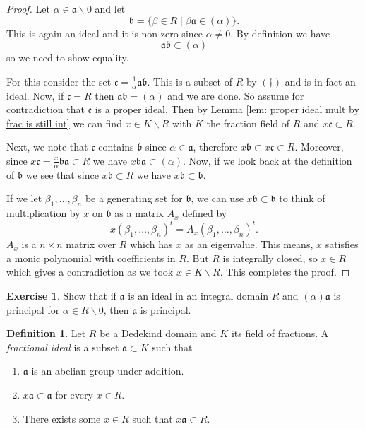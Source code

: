\documentclass[11pt,a4paper]{report}
\theoremstyle{plain}
\theoremstyle{definition}
\newtheorem{definition}[subsection]{Definition}
\theoremstyle{definition}
\newtheorem{question}[subsection]{Exercise}
\def\gothb{\mathfrak{b}}
\def\gothc{\mathfrak{c}}
\def \a{\alpha}
\def\gotha{\mathfrak{a}}
\begin{document}
	
	\begin{proof}
		Let $\a \in \gotha \backslash 0$ and let \[\gothb=\{\beta \in R \mid \beta \gotha \in (\a)\}.\] This is again an ideal and it is non-zero since $\a \neq 0$. By definition we have \begin{equation}
			\gotha \gothb \subset (\a) \tag{$\dagger$}\end{equation} so we need to show equality.
		
		For this consider the set $\gothc=\frac{1}{\a}\gotha \gothb$. This is a subset of $R$ by $(\dagger)$ and is in fact an ideal. Now, if $\gothc=R$ then $\gotha \gothb=(\a)$ and we are done. So assume for contradiction that $\gothc$ is a proper ideal. Then by Lemma \ref{lem: proper ideal mult by frac is still int} we can find $x \in K \backslash R$ with $K$ the fraction field of $R$ and $x \gothc \subset R$. 
		
		Next, we note that $\gothc$ contains $\gothb$ since $\a \in \gotha$, therefore $x \gothb \subset x \gothc \subset R$. Moreover, since $x\gothc=\frac{x}{\a}\gothb \gotha \subset R$ we have $x\gothb \gotha \subset (\a)$. Now, if we look back at the definition of $\gothb$ we see that since $x \gothb \subset R$ we have $x\gothb \subset \gothb$.
		
		If we let $\beta_1,\dots,\beta_n$ be a generating set for $\gothb$, we can use $x\gothb \subset \gothb$ to think of multiplication by $x$ on $\gothb$ as a matrix $A_x$ defined by \[x (\beta_1,\dots,\beta_n)^t=A_x (\beta_1,\dots,\beta_n)^t.\] $A_x$ is a $n \times n$ matrix over $R$ which has $x$ as an eigenvalue. This means, $x$ satisfies a monic polynomial with coefficients in $R$. But $R$ is integrally closed, so $x \in R$ which gives a contradiction as we took $x \in K\backslash R$. This completes the proof. 
	\end{proof}
	
	
	
	\begin{question}\label{ques: if prod is princ, you are princ}
		Show that if $\gotha$ is an ideal in an integral domain $R$ and $(\a)\gotha$ is principal for $\a \in R \backslash{0}$, then $\gotha$ is principal.
	\end{question}
	
	\begin{definition}
		Let $R$ be a Dedekind domain and $K$ its field of fractions. A \textit{fractional ideal} is a subset $\gotha \subset K$ such that 
		\begin{enumerate}
			\item $\gotha$ is an abelian group under addition.
			\item $x \gotha \subset \gotha$ for every $x \in R$.
			\item There exists some $x \in R$ such that $x\gotha \subset R$.
		\end{enumerate}
		
	\end{definition}
	
\end{document}
